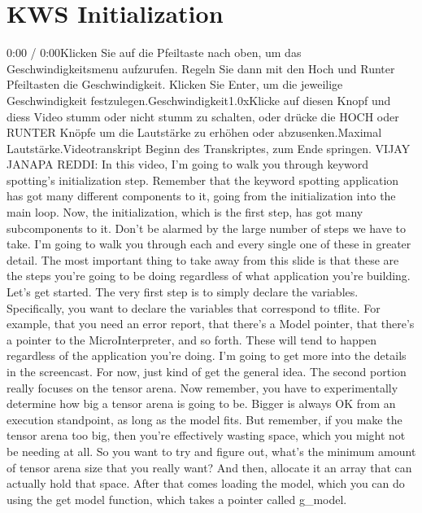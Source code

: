   \section{KWS Initialization}
  
      0:00 / 0:00Klicken Sie auf die Pfeiltaste nach oben, um das Geschwindigkeitsmenu aufzurufen. Regeln Sie dann mit den Hoch und Runter Pfeiltasten die Geschwindigkeit. Klicken Sie Enter, um die jeweilige Geschwindigkeit festzulegen.Geschwindigkeit1.0xKlicke auf diesen Knopf und diess Video stumm oder nicht stumm zu schalten, oder drücke die HOCH oder RUNTER Knöpfe um die Lautstärke zu erhöhen oder abzusenken.Maximal Lautstärke.Videotranskript
      Beginn des Transkriptes, zum Ende springen.
      VIJAY JANAPA REDDI: In this video, I'm going
      to walk you through keyword spotting's initialization step.
      Remember that the keyword spotting application
      has got many different components to it, going from the initialization
      into the main loop.
      Now, the initialization, which is the first step,
      has got many subcomponents to it.
      Don't be alarmed by the large number of steps we have to take.
      I'm going to walk you through each and every single one of these
      in greater detail.
      The most important thing to take away from this slide
      is that these are the steps you're going to be doing regardless
      of what application you're building.
      Let's get started.
      The very first step is to simply declare the variables.
      Specifically, you want to declare the variables that correspond to tflite.
      For example, that you need an error report,
      that there's a Model pointer, that there's
      a pointer to the MicroInterpreter, and so forth.
      These will tend to happen regardless of the application you're doing.
      I'm going to get more into the details in the screencast.
      For now, just kind of get the general idea.
      The second portion really focuses on the tensor arena.
      Now remember, you have to experimentally determine
      how big a tensor arena is going to be.
      Bigger is always OK from an execution standpoint, as long as the model fits.
      But remember, if you make the tensor arena too big,
      then you're effectively wasting space, which you might not be needing at all.
      So you want to try and figure out, what's the minimum amount of tensor
      arena size that you really want?
      And then, allocate it an array that can actually hold that space.
      After that comes loading the model, which
      you can do using the get model function, which takes a pointer called g\_model.
